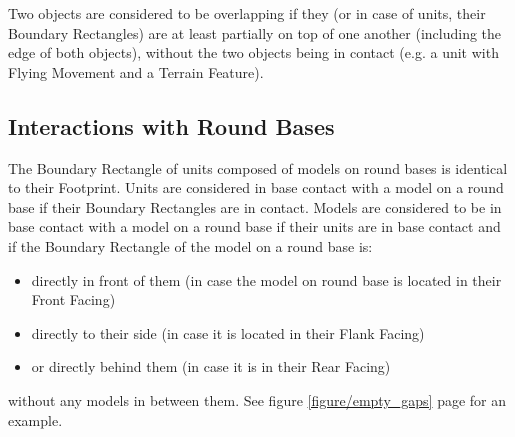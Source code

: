 Two objects are considered to be overlapping if they (or in case of units, their Boundary Rectangles) are at least partially on top of one another (including the edge of both objects), without the two objects being in contact (e.g. a unit with Flying Movement and a Terrain Feature).

\subsection{Interactions with Round Bases}
\label{interactions_with_round_bases}

The Boundary Rectangle of units composed of models on round bases is identical to their Footprint. Units are considered in base contact with a model on a round base if their Boundary Rectangles are in contact. Models are considered to be in base contact with a model on a round base if their units are in base contact and if the Boundary Rectangle of the model on a round base is:
\begin{itemize}[label={-}]
\item directly in front of them (in case the model on round base is located in their Front Facing)
\item directly to their side (in case it is located in their Flank Facing)
\item or directly behind them (in case it is in their Rear Facing)
\end{itemize}
without any models in between them. See figure \ref{figure/empty_gaps} page \pageref{figure/empty_gaps} for an example.
